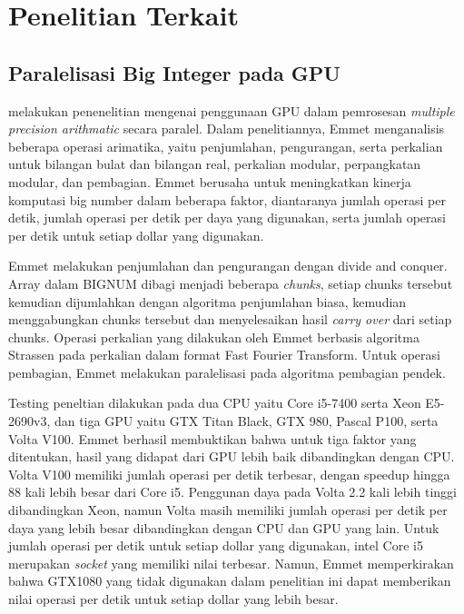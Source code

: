 \section{Penelitian Terkait}
  \subsection{Paralelisasi Big Integer pada GPU}
    \citet{gpu_bignum} melakukan penenelitian mengenai penggunaan GPU dalam pemrosesan \textit{multiple precision arithmatic} secara paralel. Dalam penelitiannya, Emmet menganalisis beberapa operasi arimatika, yaitu penjumlahan, pengurangan, serta perkalian untuk bilangan bulat dan bilangan real, perkalian modular, perpangkatan modular, dan pembagian. Emmet berusaha untuk meningkatkan kinerja komputasi big number dalam beberapa faktor, diantaranya jumlah operasi per detik, jumlah operasi per detik per daya yang digunakan, serta jumlah operasi per detik untuk setiap dollar yang digunakan.

    Emmet melakukan penjumlahan dan pengurangan dengan divide and conquer. Array dalam BIGNUM dibagi menjadi beberapa \textit{chunks}, setiap chunks tersebut kemudian dijumlahkan dengan algoritma penjumlahan biasa, kemudian menggabungkan chunks tersebut dan menyelesaikan hasil \textit{carry over} dari setiap chunks. Operasi perkalian yang dilakukan oleh Emmet berbasis algoritma Strassen pada perkalian dalam format Fast Fourier Transform. Untuk operasi pembagian, Emmet melakukan paralelisasi pada algoritma pembagian pendek.


    Testing peneltian dilakukan pada dua CPU yaitu Core i5-7400 serta Xeon E5-2690v3, dan tiga GPU yaitu GTX Titan Black, GTX 980, Pascal P100, serta Volta V100. Emmet berhasil membuktikan bahwa untuk tiga faktor yang ditentukan, hasil yang didapat dari GPU lebih baik dibandingkan dengan CPU. Volta V100 memiliki jumlah operasi per detik terbesar, dengan speedup hingga 88 kali lebih besar dari Core i5. Penggunan daya pada Volta 2.2 kali lebih tinggi dibandingkan Xeon, namun Volta masih memiliki jumlah operasi per detik per daya yang lebih besar dibandingkan dengan CPU dan GPU yang lain. Untuk jumlah operasi per detik untuk setiap dollar yang digunakan, intel Core i5 merupakan \textit{socket} yang memiliki nilai terbesar. Namun, Emmet memperkirakan bahwa GTX1080 yang tidak digunakan dalam penelitian ini dapat memberikan nilai operasi per detik untuk setiap dollar yang lebih besar.

